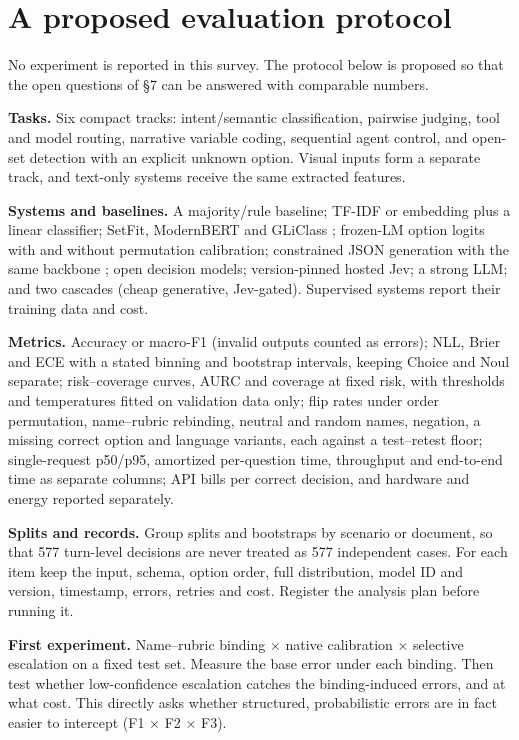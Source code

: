 \section{A proposed evaluation protocol}\label{sec:a-proposed-evaluation-protocol}

No experiment is reported in this survey. The protocol below is proposed so that the open questions of §7 can be answered with comparable numbers.

\textbf{Tasks.} Six compact tracks: intent/semantic classification, pairwise judging, tool and model routing, narrative variable coding, sequential agent control, and open-set detection with an explicit unknown option. Visual inputs form a separate track, and text-only systems receive the same extracted features.

\textbf{Systems and baselines.} A majority/rule baseline; TF-IDF or embedding plus a linear classifier; SetFit, ModernBERT and GLiClass \citep{arxiv2209_11055,arxiv2412_13663,arxiv2508_07662}; frozen-LM option logits with and without permutation calibration; constrained JSON generation with the same backbone \citep{arxiv2411_15100}; open decision models; version-pinned hosted Jev; a strong LLM; and two cascades (cheap generative, Jev-gated). Supervised systems report their training data and cost.

\textbf{Metrics.} Accuracy or macro-F1 (invalid outputs counted as errors); NLL, Brier and ECE with a stated binning and bootstrap intervals, keeping Choice and Noul separate; risk–coverage curves, AURC and coverage at fixed risk, with thresholds and temperatures fitted on validation data only; flip rates under order permutation, name–rubric rebinding, neutral and random names, negation, a missing correct option and language variants, each against a test–retest floor; single-request p50/p95, amortized per-question time, throughput and end-to-end time as separate columns; API bills per correct decision, and hardware and energy reported separately.

\textbf{Splits and records.} Group splits and bootstraps by scenario or document, so that 577 turn-level decisions are never treated as 577 independent cases. For each item keep the input, schema, option order, full distribution, model ID and version, timestamp, errors, retries and cost. Register the analysis plan before running it.

\textbf{First experiment.} Name–rubric binding × native calibration × selective escalation on a fixed test set. Measure the base error under each binding. Then test whether low-confidence escalation catches the binding-induced errors, and at what cost. This directly asks whether structured, probabilistic errors are in fact easier to intercept (F1 × F2 × F3).

